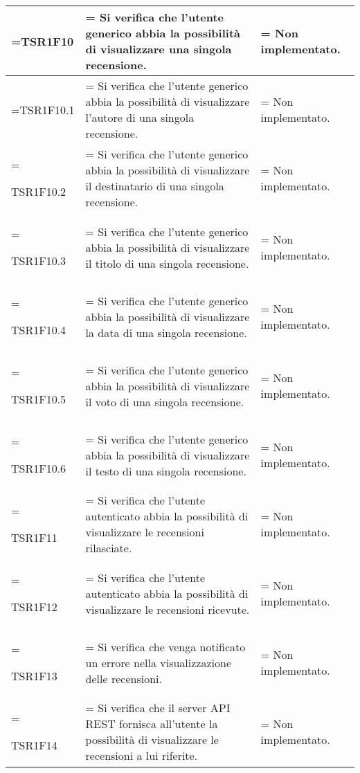 \begin{xltabular}{\textwidth} {
            >{\hsize\linewidth=\hsize}X
            >{\hsize\linewidth=\hsize}X
            >{\hsize\linewidth=\hsize}X
        }
        TSR1F10 &
        Si verifica che l'utente generico abbia la possibilità di visualizzare una singola recensione. &
        Non implementato.
        \\ \hline

        TSR1F10.1 &
        Si verifica che l'utente generico abbia la possibilità di visualizzare l'autore di una singola recensione.  &
        Non implementato.
        \\ \hline

        TSR1F10.2 &
        Si verifica che l'utente generico abbia la possibilità di visualizzare il destinatario di una singola recensione.  &
        Non implementato.
        \\ \hline

        TSR1F10.3 &
        Si verifica che l'utente generico abbia la possibilità di visualizzare il titolo di una singola recensione.  &
        Non implementato.
        \\ \hline

        TSR1F10.4 &
        Si verifica che l'utente generico abbia la possibilità di visualizzare la data di una singola recensione.  &
        Non implementato.
        \\ \hline
        
        TSR1F10.5 &
        Si verifica che l'utente generico abbia la possibilità di visualizzare il voto di una singola recensione.  &
        Non implementato.
        \\ \hline

        TSR1F10.6 &
        Si verifica che l'utente generico abbia la possibilità di visualizzare il testo di una singola recensione.  &
        Non implementato.
        \\ \hline

        TSR1F11 &
        Si verifica che l'utente autenticato abbia la possibilità di visualizzare le recensioni rilasciate.  &
        Non implementato.
        \\ \hline

        TSR1F12 &
        Si verifica che l'utente autenticato abbia la possibilità di visualizzare le recensioni ricevute.  &
        Non implementato.
        \\ \hline

        TSR1F13 &
        Si verifica che venga notificato un errore nella visualizzazione delle recensioni.  &
        Non implementato.
        \\ \hline

        TSR1F14 &
        Si verifica che il server API REST fornisca all'utente la possibilità di visualizzare le recensioni a lui riferite. &
        Non implementato.
        \\ \hline


\end{xltabular}
